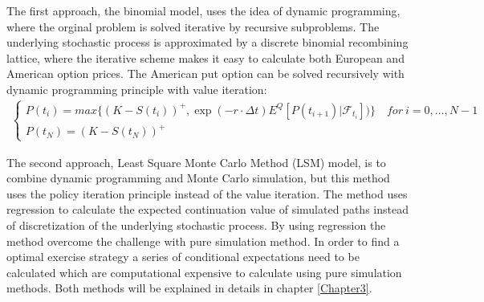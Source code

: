 The first approach, the binomial model, uses the idea of dynamic programming, where the orginal problem is solved iterative by recursive subproblems. The underlying stochastic process is approximated by a discrete binomial recombining lattice, where the iterative scheme makes it easy to calculate both European and American option prices. The American put option can be solved recursively with dynamic programming principle with value iteration: 
\begin{equation}\label{BellmanEq}
\begin{split}
\begin{cases}
          P(t_i) = max\{ (K-S(t_i))^+, \exp(-r\cdot \Delta t) E^Q[P(t_{i+1})|\mathcal{F}_{t_i}])\} \quad for \ i={0,\ldots,N-1} \\
          P(t_N) = (K-S(t_N))^+ 
\end{cases}
\end{split}
\end{equation}

The second approach, Least Square Monte Carlo Method (LSM) model, is to combine dynamic programming and Monte Carlo simulation, but this method uses the policy iteration principle instead of the value iteration. The method uses regression to calculate the expected continuation value of simulated paths instead of discretization of the underlying stochastic process. By using regression the method overcome the challenge with pure simulation method. In order to find a optimal exercise strategy a series of conditional expectations need to be calculated which are computational expensive to calculate using pure simulation methods. Both methods will be explained in details in chapter \ref{Chapter3}.





